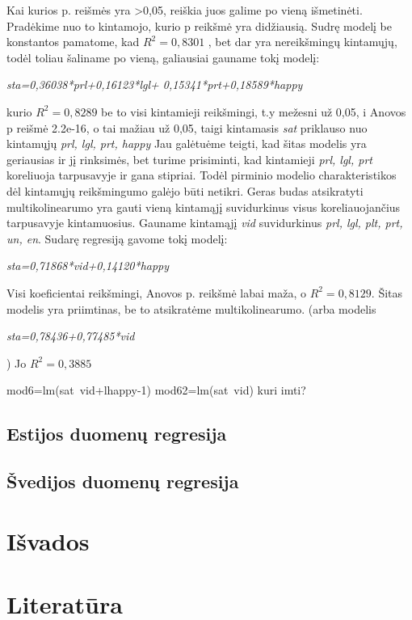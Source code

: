 \documentclass[12pt,a4paper]{article}
\theoremstyle{change}\newtheorem{salyga}{Uždavinys}
\begin{document}
Kai kurios p. reišmės yra >0,05, reiškia juos galime po vieną išmetinėti. Pradėkime nuo to kintamojo, kurio p reikšmė yra didžiausią. Sudrę modelį be konstantos pamatome, kad $R^2=0,8301$ , bet dar yra nereikšmingų kintamųjų, todėl toliau šaliname po vieną, galiausiai gauname tokį modelį:
\begin{center} \textit{
        sta=0,36038*prl+0,16123*lgl+
0,15341*prt+0,18589*happy 
} \end{center}
kurio $R^2=0,8289$ be to visi  kintamieji reikšmingi, t.y mežesni už 0,05, i Anovos p reišmė 2.2e-16, o tai mažiau už 0,05, taigi kintamasis \textit{sat} priklauso nuo kintamųjų \textit{prl, lgl, prt, happy}
\newline
Jau galėtuėme teigti, kad šitas modelis yra geriausias ir jį rinksimės, bet turime prisiminti, kad kintamieji \textit{prl, lgl, prt} koreliuoja tarpusavyje ir gana stipriai. Todėl pirminio modelio charakteristikos dėl kintamųjų reikšmingumo galėjo būti netikri.
\newline Geras budas atsikratyti multikolinearumo yra gauti vieną kintamąjį suvidurkinus visus koreliauojančius tarpusavyje kintamuosius. Gauname kintamąjį \textit{vid}  suvidurkinus \textit{prl, lgl, plt, prt, un, en}.
\newline
Sudarę regresiją gavome tokį modelį:
\begin{center} \textit{
        sta=0,71868*vid+0,14120*happy 
} \end{center}
Visi koeficientai reikšmingi, Anovos p. reikšmė labai maža, o $R^2=0,8129$. Šitas modelis yra priimtinas, be to atsikratėme multikolinearumo.
(arba modelis 
\begin{center} \textit{
        sta=0,78436+0,77485*vid 
} \end{center}                                               )  Jo   $R^2=0,3885$

 mod6=lm(sat~vid+lhappy-1)
 mod62=lm(sat~vid)
kuri imti?





\subsection{Estijos duomenų regresija}
\subsection{Švedijos duomenų regresija}

\newpage



\section{Išvados}



\newpage



\section{Literatūra}




\newpage

     
\end{document}
